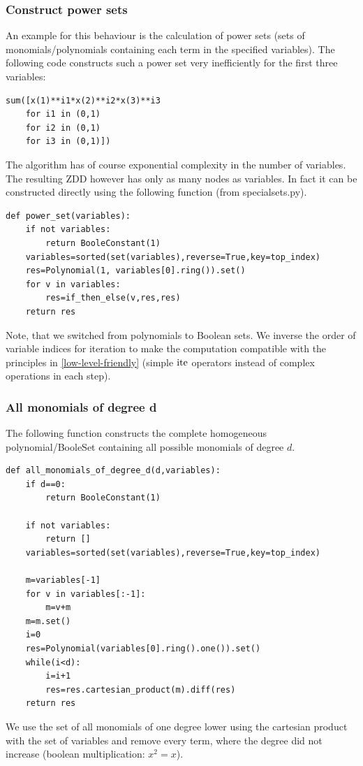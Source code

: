 \subsubsection{Construct power sets}
An example for this behaviour is the calculation of power sets (sets of monomials/polynomials containing each term in the specified variables).
The following code constructs such a power set very inefficiently for the first three variables:
\begin{lstlisting}
sum([x(1)**i1*x(2)**i2*x(3)**i3 
    for i1 in (0,1) 
    for i2 in (0,1) 
    for i3 in (0,1)])
\end{lstlisting}
The algorithm has of course exponential complexity in the number of variables.
The resulting ZDD however has only as many nodes as variables.
In fact it can be constructed directly using the following function (from specialsets.py).
\begin{lstlisting}
def power_set(variables):
    if not variables:
        return BooleConstant(1)
    variables=sorted(set(variables),reverse=True,key=top_index)
    res=Polynomial(1, variables[0].ring()).set()
    for v in variables:
        res=if_then_else(v,res,res)
    return res
\end{lstlisting}
Note, that we switched from polynomials to Boolean sets. We inverse the order of variable indices for iteration to make the computation compatible with the principles in \ref{low-level-friendly} (simple $\operatorname{ite}$ operators instead of complex operations in each step).

\subsubsection{All monomials of degree d}
\label{all-monomials-set-operations}
The following function constructs the complete homogeneous polynomial/BooleSet containing all possible monomials of degree $d$.
\begin{lstlisting}
def all_monomials_of_degree_d(d,variables):
    if d==0:
        return BooleConstant(1)
    
    if not variables:
        return []
    variables=sorted(set(variables),reverse=True,key=top_index)

    m=variables[-1]
    for v in variables[:-1]:
        m=v+m
    m=m.set()
    i=0
    res=Polynomial(variables[0].ring().one()).set()
    while(i<d):
        i=i+1
        res=res.cartesian_product(m).diff(res)
    return res
\end{lstlisting}
We use the set of all monomials of one degree lower using the cartesian product with the set of variables and remove every term, where the degree did not increase (boolean multiplication: $x^2=x$).
